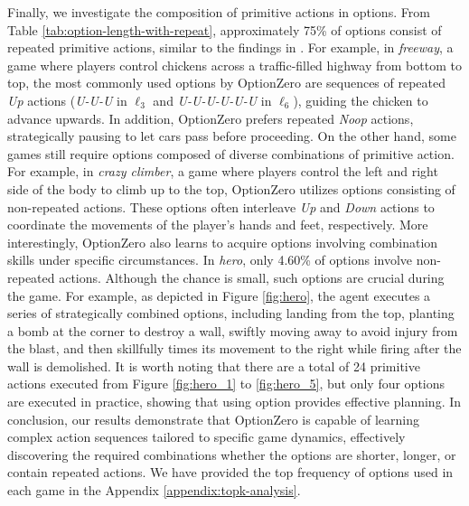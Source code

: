 Finally, we investigate the composition of primitive actions in options.
From Table \ref{tab:option-length-with-repeat}, approximately 75\% of options consist of repeated primitive actions, similar to the findings in \citet{sharma_learning_2016}.
For example, in \textit{freeway}, a game where players control chickens across a traffic-filled highway from bottom to top, the most commonly used options by OptionZero are sequences of repeated \textit{Up} actions (\textit{U-U-U} in $\ell_3$ and \textit{U-U-U-U-U-U} in $\ell_6$), guiding the chicken to advance upwards.
In addition, OptionZero prefers repeated \textit{Noop} actions, strategically pausing to let cars pass before proceeding.
On the other hand, some games still require options composed of diverse combinations of primitive action.
For example, in \textit{crazy climber}, a game where players control the left and right side of the body to climb up to the top, OptionZero utilizes options consisting of non-repeated actions.
These options often interleave \textit{Up} and \textit{Down} actions to coordinate the movements of the player's hands and feet, respectively.
More interestingly, OptionZero also learns to acquire options involving combination skills under specific circumstances.
In \textit{hero}, only 4.60\% of options involve non-repeated actions.
Although the chance is small, such options are crucial during the game.
For example, as depicted in Figure \ref{fig:hero}, the agent executes a series of strategically combined options, including landing from the top, planting a bomb at the corner to destroy a wall, swiftly moving away to avoid injury from the blast, and then skillfully times its movement to the right while firing after the wall is demolished.
It is worth noting that there are a total of 24 primitive actions executed from Figure \ref{fig:hero_1} to \ref{fig:hero_5}, but only four options are executed in practice, showing that using option provides effective planning.
In conclusion, our results demonstrate that OptionZero is capable of learning complex action sequences tailored to specific game dynamics, effectively discovering the required combinations whether the options are shorter, longer, or contain repeated actions.
We have provided the top frequency of options used in each game in the Appendix \ref{appendix:topk-analysis}.

